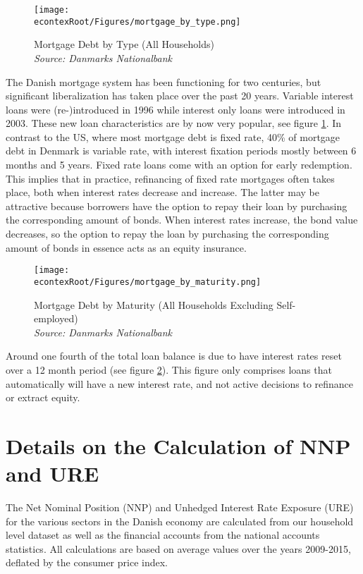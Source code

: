 \documentclass[titlepage]{\econtex}\newcommand{\texname}{ConsumptionHeterogeneity}
\begin{document}
\begin{figure} 
	\begin{centering}
		\texttt{[image: \\econtexRoot/Figures/mortgage\_by\_type.png]} 
		\caption{Mortgage Debt by Type (All Households)
		{\\ \emph{\footnotesize
	{Source: Danmarks Nationalbank}}
	}}
		\label{fig:mortgage_by_type}
	\end{centering}
\end{figure}

The Danish mortgage system has been functioning for two centuries, but significant liberalization has taken place over the past 20 years. Variable interest loans were (re-)introduced in 1996 while interest only loans were introduced in 2003. These new loan characteristics are by now very popular, see figure \ref{fig:mortgage_by_type}. In contrast to the US, where most mortgage debt is fixed rate, 40\% of mortgage debt in Denmark is variable rate, with interest fixation periods mostly between 6 months and 5 years. Fixed rate loans come with an option for early redemption. This implies that in practice, refinancing of fixed rate mortgages often takes place, both when interest rates decrease and increase. The latter may be attractive because borrowers have the option to repay their loan by purchasing the corresponding amount of bonds. When interest rates increase, the bond value decreases, so the option to repay the loan by purchasing the corresponding amount of bonds in essence acts as an equity insurance.  

\begin{figure} 
	\begin{centering}
		\texttt{[image: \\econtexRoot/Figures/mortgage\_by\_maturity.png]} 
		\caption{Mortgage Debt by Maturity (All Households Excluding Self-employed)
		{\\ \emph{\footnotesize
	{Source: Danmarks Nationalbank}}
	}}
		\label{fig:mortgage_by_maturity}
	\end{centering}
\end{figure}

Around one fourth of the total loan balance is due to have interest rates reset over a 12 month period (see figure \ref{fig:mortgage_by_maturity}). This figure only comprises loans that automatically will have a new interest rate, and not active decisions to refinance or extract equity. 

\section{Details on the Calculation of NNP and URE}
\setcounter{figure}{0}   
\setcounter{table}{0} 
\label{URE_NNP_appendix}
The Net Nominal Position (NNP) and Unhedged Interest Rate Exposure (URE) for the various sectors in the Danish economy are calculated from our household level dataset as well as the financial accounts from the national accounts statistics. All calculations are based on average values over the years 2009-2015, deflated by the consumer price index. 
\end{document}
